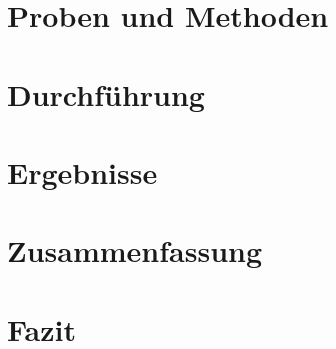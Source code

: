 \documentclass[12pt,a4paper,ngerman,captions=tableheading]{scrartcl}
\begin{document}

%


\section{Proben und Methoden}



\section{Durchführung}




\section{Ergebnisse}




\section{Zusammenfassung}



\section{Fazit}



\end{document}
